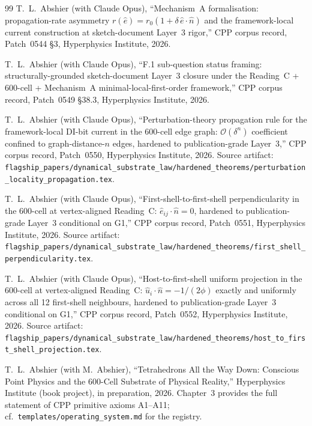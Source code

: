 \documentclass[11pt,letterpaper]{article}
\begin{document}
\begin{thebibliography}{99}
T.~L.~Abshier (with Claude Opus),
``Mechanism~A formalisation: propagation-rate asymmetry $r(\hat{e}) = r_0(1 + \delta\,\hat{e}\cdot\hat{n})$ and the framework-local current construction at sketch-document Layer~3 rigor,''
CPP corpus record, Patch~0544 \S3, Hyperphysics Institute, 2026.

T.~L.~Abshier (with Claude Opus),
``F.1 sub-question status framing: structurally-grounded sketch-document Layer~3 closure under the Reading~C + 600-cell + Mechanism~A minimal-local-first-order framework,''
CPP corpus record, Patch~0549 \S38.3, Hyperphysics Institute, 2026.

T.~L.~Abshier (with Claude Opus),
``Perturbation-theory propagation rule for the framework-local DI-bit current in the 600-cell edge graph: $\mathcal{O}(\delta^n)$ coefficient confined to graph-distance-$n$ edges, hardened to publication-grade Layer~3,''
CPP corpus record, Patch~0550, Hyperphysics Institute, 2026.
Source artifact: \texttt{flagship\_papers/dynamical\_substrate\_law/hardened\_theorems/perturbation\_locality\_propagation.tex}.

T.~L.~Abshier (with Claude Opus),
``First-shell-to-first-shell perpendicularity in the 600-cell at vertex-aligned Reading~C: $\hat{e}_{ij} \cdot \hat{n} = 0$, hardened to publication-grade Layer~3 conditional on G1,''
CPP corpus record, Patch~0551, Hyperphysics Institute, 2026.
Source artifact: \texttt{flagship\_papers/dynamical\_substrate\_law/hardened\_theorems/first\_shell\_perpendicularity.tex}.

T.~L.~Abshier (with Claude Opus),
``Host-to-first-shell uniform projection in the 600-cell at vertex-aligned Reading~C: $\hat{u}_i \cdot \hat{n} = -1/(2\phi)$ exactly and uniformly across all 12 first-shell neighbours, hardened to publication-grade Layer~3 conditional on G1,''
CPP corpus record, Patch~0552, Hyperphysics Institute, 2026.
Source artifact: \texttt{flagship\_papers/dynamical\_substrate\_law/hardened\_theorems/host\_to\_first\_shell\_projection.tex}.

T.~L.~Abshier (with M.~Abshier),
``Tetrahedrons All the Way Down: Conscious Point Physics and the 600-Cell Substrate of Physical Reality,''
Hyperphysics Institute (book project), in preparation, 2026.
Chapter~3 provides the full statement of CPP primitive axioms A1--A11; cf.\ \texttt{templates/operating\_system.md} for the registry.


\end{thebibliography}
\end{document}
